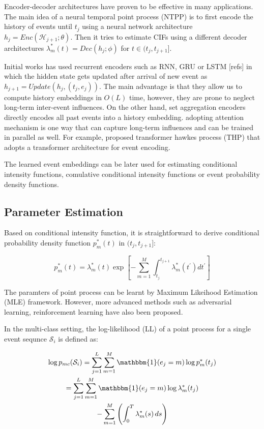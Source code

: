 \documentclass[journal,twoside,web]{ieeecolor}
\begin{document}
Encoder-decoder architectures have proven to be effective in many applications. The main idea of a neural temporal point process (NTPP) is to first encode the history of events until $t_j$ using a neural network architecture $h_j=Enc(\mathcal{H}_{j+1};\theta)$. Then it tries to estimate CIFs using a different decoder architectures $\lambda^*_m(t)=Dec(h_j;\phi)$ for $ t \in (t_j,t_{j+1}]$.

Initial works has used recurrent encoders such as RNN, GRU or LSTM [refs] in which the hidden state gets updated after arrival of new event as $h_{j+1}=Update(h_j,(t_j,e_j))$. The main advantage is that they allow us to compute history embeddings in $O(L)$ time, however, they are prone to neglect long-term inter-event influences. On the other hand, set aggregation encoders directly encodes all past events into a history embedding. adopting attention mechanism is one way that can capture long-term influences and can be trained in parallel as well. For example, \cite*{zuoTransformerHawkesProcess2020a} proposed transformer hawkes process (THP) that adopts a transformer architecture for event encoding.

The learned event embeddings can be later used for estimating conditional intensity functions, comulative conditional intensity functions or event probability density functions.



\subsection{Parameter Estimation}

Based on conditional intensity function, it is straightforward to derive conditional probability density function $p^{*}_{m}(t)$ in $(t_j, t_{j+1}]$:

\begin{equation} 
    p_m^{*}(t)=\lambda_m^{*}(t) \exp \left[-\sum_{m=1}^{M} \int_{t_j}^{t_{j+1}}\lambda_m^{*}(t^{\prime})dt^{\prime}\right]
 \end{equation}
 

 The paramters of point process can be learnt by Maximum Likeihood Estimation (MLE) framework. However, more advanced methods such as adversarial learning, reinforcement learning have also been proposed.

In the multi-class setting, the log-likelihood (LL) of a point process for a single event sequnce $\mathcal{S}_{i}$ is defined as:

\begin{multline} \label{eq:CIF-mc}
    \log p_{mc}(\mathcal{S}_{i})  =  \sum_{j = 1}^{L}\sum_{m = 1}^{M} \mathbbm{1}(e_j=m)   \log p_m^{*}(t_j) \\   
    = \sum_{j = 1}^{L}\sum_{m = 1}^{M} \mathbbm{1}(e_j=m)   \log \lambda_m^{*}(t_j)\\
    -\sum_{m = 1}^{M} \left(   \int_{0}^{T}  \lambda_m^{*}(s) \,ds  \right)
\end{multline} 
\end{document}

